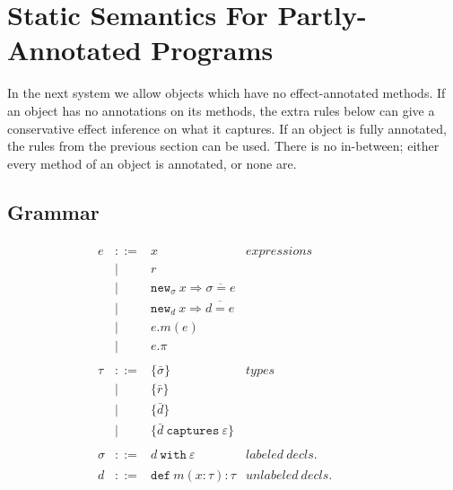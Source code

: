 \documentclass{llncs}
\newcommand{\keywadj}[1]{\mathtt{#1}}
\newcommand{\keyw}[1]{\keywadj{#1}~}
\begin{document}

\newpage

\section{Static Semantics For Partly-Annotated Programs}

\noindent
In the next system we allow objects which have no effect-annotated methods. If an object has no annotations on its methods, the extra rules below can give a conservative effect inference on what it captures. If an object is fully annotated, the rules from the previous section can be used. There is no in-between; either every method of an object is annotated, or none are.

\subsection{Grammar}

\[
\begin{array}{lll}

\begin{array}{lllr}

e & ::= & x & expressions \\
  		& | & r \\
		& | & \keywadj{new}_\sigma~x \Rightarrow \overline{\sigma = e} \\
 		& | & \keywadj{new}_d~x \Rightarrow \overline{d = e} \\
 		& | & e.m(e)\\
 		& | & e.\pi\\
		&&\\

\tau & ::= & \{ \bar \sigma \} & types \\
		& | & \{ \bar r \} \\
		& | & \{ \bar d \} \\
		& | & \{ \bar d ~\keyw{captures} \varepsilon \} \\
		&&\\
		
\sigma & ::= & d~\keyw{with}\varepsilon  & labeled~ decls.\\
		&&\\

d & ::= & \keyw{def} m(x:\tau):\tau & unlabeled~decls.\\
		&&\\

\end{array}
& ~~~~~~
&
\end{array}
\]
\end{document}
